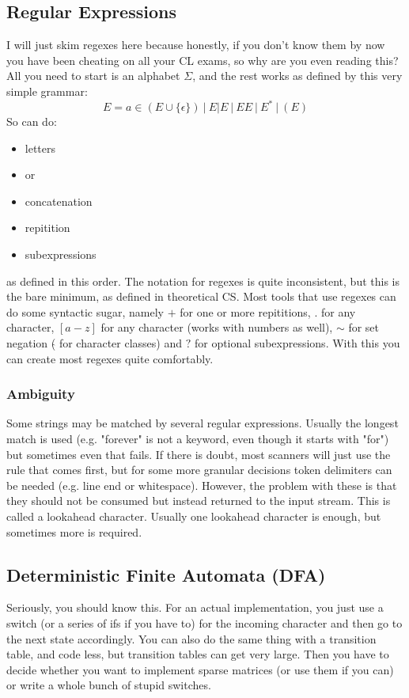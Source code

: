 \documentclass{article}
\begin{document}
\subsection{Regular Expressions}
I will just skim regexes here because honestly, if you don't know them by now you have been cheating on all your CL exams, so why are you even reading this?
All you need to start is an alphabet $\Sigma$, and the rest works as defined by this very simple grammar:
\begin{equation*}
	E = a \in (E \cup \{\epsilon\})\ |\ E|E\ |\ EE\ |\ E^*\ |\ (E)
\end{equation*}
So can do:
\begin{itemize}
	\item letters
	\item or
	\item concatenation
	\item repitition
	\item subexpressions
\end{itemize}
as defined in this order.
The notation for regexes is quite inconsistent, but this is the bare minimum, as defined in theoretical CS.
Most tools that use regexes can do some syntactic sugar, namely $+$ for one or more repititions, $.$ for any character, $\left[a-z\right]$ for any character (works with numbers as well), $\sim$ for set negation ($\hat{ }$ for character classes) and $?$ for optional subexpressions.
With this you can create most regexes quite comfortably.

\subsubsection{Ambiguity}
Some strings may be matched by several regular expressions.
Usually the longest match is used (e.g. "forever" is not a keyword, even though it starts with "for") but sometimes even that fails.
If there is doubt, most scanners will just use the rule that comes first, but for some more granular decisions token delimiters can be needed (e.g. line end or whitespace).
However, the problem with these is that they should not be consumed but instead returned to the input stream.
This is called a lookahead character.
Usually one lookahead character is enough, but sometimes more is required.

\subsection{Deterministic Finite Automata (DFA)}
Seriously, you should know this.
For an actual implementation, you just use a switch (or a series of ifs if you have to) for the incoming character and then go to the next state accordingly.
You can also do the same thing with a transition table, and code less, but transition tables can get very large.
Then you have to decide whether you want to implement sparse matrices (or use them if you can) or write a whole bunch of stupid switches.
\end{document}

